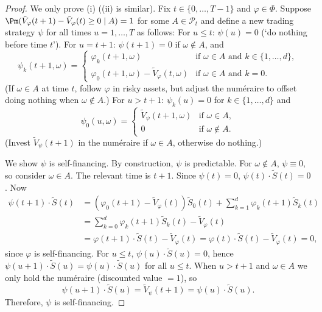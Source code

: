 \begin{proof}
	We only prove (i) ((ii) is similar). Fix \(t\in\{0,\dots,T-1\}\) and \(\varphi\in\Phi\). Suppose \(\Pm(\tilde{V}_{\varphi}(t+1)-\tilde{V}_{\varphi}(t)\ge 0\mid A)=1\) for some \(A\in\mathcal{P}_t\) and define a new trading strategy \(\psi\) for all times \(u=1,\dots,T\) as follows: For \(u\le t\): \(\psi(u)=0\) (‘do nothing before time \(t\)’). For \(u=t+1\): \(\psi(t+1)=0\) if \(\omega\notin A\), and
	\[
		\psi_k(t+1,\omega)=\begin{cases}
			\varphi_k(t+1,\omega)                               & \text{if }\omega\in A\text{ and }k\in\{1,\dots,d\}, \\
			\varphi_0(t+1,\omega)-\tilde{V}_{\varphi}(t,\omega) & \text{if }\omega\in A\text{ and }k=0.
		\end{cases}
	\]
	(If \(\omega\in A\) at time \(t\), follow \(\varphi\) in risky assets, but adjust the num\'eraire to offset doing nothing when \(\omega\notin A\).) For \(u>t+1\): \(\psi_k(u)=0\) for \(k\in\{1,\dots,d\}\) and
	\[
		\psi_0(u,\omega)=\begin{cases}
			\tilde{V}_{\psi}(t+1,\omega) & \text{if }\omega\in A,    \\
			0                            & \text{if }\omega\notin A.
		\end{cases}
	\]
	(Invest \(\tilde{V}_{\psi}(t+1)\) in the num\'eraire if \(\omega\in A\), otherwise do nothing.)

	We show \(\psi\) is self-financing. By construction, \(\psi\) is predictable. For \(\omega\notin A\), \(\psi\equiv 0\), so consider \(\omega\in A\). The relevant time is \(t+1\). Since \(\psi(t)=0\), \(\psi(t)\cdot\tilde{S}(t)=0\). Now
	\[
		\begin{aligned}
			\psi(t+1)\cdot\tilde{S}(t) & =(\varphi_0(t+1)-\tilde{V}_{\varphi}(t))\tilde{S}_0(t)+\sum_{k=1}^d \varphi_k(t+1)\tilde{S}_k(t)            \\
			                           & =\sum_{k=0}^d \varphi_k(t+1)\tilde{S}_k(t)-\tilde{V}_{\varphi}(t)                                           \\
			                           & =\varphi(t+1)\cdot\tilde{S}(t)-\tilde{V}_{\varphi}(t)=\varphi(t)\cdot\tilde{S}(t)-\tilde{V}_{\varphi}(t)=0,
		\end{aligned}
	\]
	since \(\varphi\) is self-financing. For \(u\le t\), \(\psi(u)\cdot\tilde{S}(u)=0\), hence \(\psi(u+1)\cdot\tilde{S}(u)=\psi(u)\cdot\tilde{S}(u)\) for all \(u\le t\). When \(u>t+1\) and \(\omega\in A\) we only hold the num\'eraire (discounted value \(=1\)), so
	\[
		\psi(u+1)\cdot\tilde{S}(u)=\tilde{V}_{\psi}(t+1)=\psi(u)\cdot\tilde{S}(u).
	\]
	Therefore, \(\psi\) is self-financing.


\end{proof}
